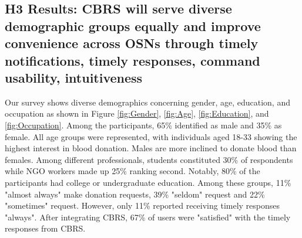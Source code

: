 \documentclass[11pt]{article}
\begin{document}
\begin{table}[h]
\centering
\caption{Cost analysis of dual-layered filtering}
\label{cost}
\end{table}


\subsection{H3 Results: CBRS will serve diverse demographic groups equally and improve convenience across OSNs through timely notifications, timely responses, command usability, intuitiveness}
Our survey shows diverse demographics concerning gender, age, education, and occupation as shown in Figure \ref{fig:Gender}, \ref{fig:Age}, \ref{fig:Education}, and \ref{fig:Occupation}. Among the participants, 65\% identified as male and 35\% as female. All age groups were represented, with individuals aged 18-33 showing the highest interest in blood donation. Males are more inclined to donate blood than females. Among different professionals, students constituted 30\% of respondents while NGO workers made up 25\% ranking second. Notably, 80\% of the participants had college or undergraduate education. Among these groups, 11\% "almost always" make donation requests, 39\% "seldom" request and 22\% "sometimes" request. However, only 11\% reported receiving timely responses "always". After integrating CBRS, 67\% of users were "satisfied" with the timely responses from CBRS. 


\end{document}

